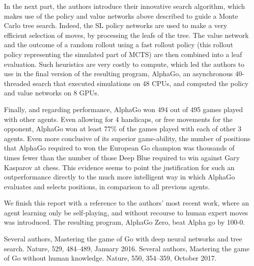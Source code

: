 \documentclass{report}
\begin{document}
In the next part, the authors introduce  their innovative search algorithm, which makes use of the policy and value networks above described to guide a Monte Carlo tree search. Indeed, the SL policy networks are used to make a very efficient selection of moves, by processing the leafs of the tree. The  value network and the outcome of a random rollout using a fast rollout policy (this rollout policy representing the simulated part of MCTS)  are then combined into a leaf evaluation. Such heuristics are very costly to compute, which led the authors to use in the final version of the resulting program, AlphaGo, an asynchronous 40-threaded search that executed simulations on 48 CPUs, and computed the policy and value networks on 8 GPUs. 

Finally, and regarding  performance, AlphaGo won 494  out of 495 games played with other agents. Even allowing for 4 handicaps, or free movements for the opponent, AlphaGo won at least 77\% of the games played with each of other 3 agents. Even more conclusive of its superior game-ability, the number of positions that AlphaGo required to won the European Go champion was thousands of times fewer than the  number of those Deep Blue required to win against Gary Kasparov at chess. This evidence seems to point the justification for such an outperformance directly to the much more intelligent way in which AlphaGo evaluates and selects positions, in comparison to all previous agents. 

We finish this report with a reference to the authors' most recent work, where an agent learning only be self-playing, and without recourse to human expert moves was introduced. The resulting program, AlphaGo Zero, beat Alpha go by 100-0.






\begin{thebibliography}{1}
Several authors, Mastering the game of Go with deep neural networks and tree search. Nature, 529, 484--489, January 2016.
Several authors, Mastering the game of Go without human knowledge. Nature, 550, 354--359, October 2017.

 \end{thebibliography} 
 
\end{document}
